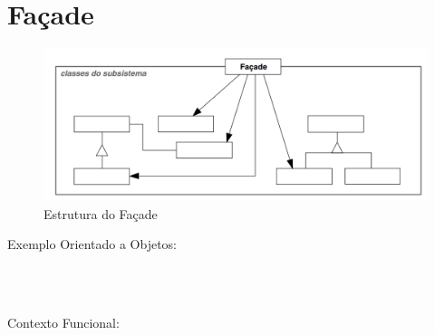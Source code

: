 \section{Façade}



\begin{figure}[htb]
	\caption{\label{fig_grafico}Estrutura do Façade}
	\begin{center}
	    \includegraphics[scale=0.42]{5_padroes-contexto-funcional/5.2_estruturais/5.2.5_facade/diagram.png}
	\end{center}
\end{figure}

Exemplo Orientado a Objetos:

\begin{lstlisting}[caption={Façade Orientado a Objetos},label=oofacade]



\end{lstlisting}

Contexto Funcional:


\begin{lstlisting}[caption={Façade Funcional},label=fpfacade]
    

    
\end{lstlisting}